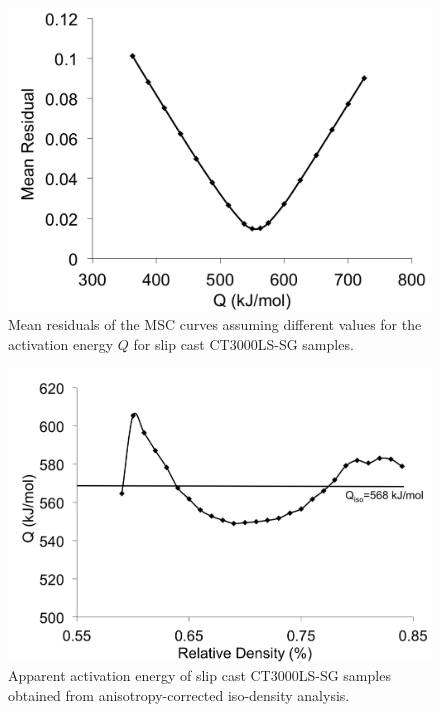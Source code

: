 \newpage
\begin{figure}[H]
	\centering
	\includegraphics[width=\textwidth]{Chapter-6/Figures/Figure4.png}
	\caption{Mean residuals of the MSC curves assuming different values for the activation energy $Q$ for slip cast CT3000LS-SG samples.}
	\label{Ch6-figure:Figure4}
\end{figure}

\newpage
\begin{figure}[H]
	\centering
	\includegraphics[width=\textwidth]{Chapter-6/Figures/Figure5.png}
	\caption{Apparent activation energy of slip cast CT3000LS-SG samples obtained from anisotropy-corrected iso-density analysis.}
	\label{Ch6-figure:Figure5}
\end{figure}

